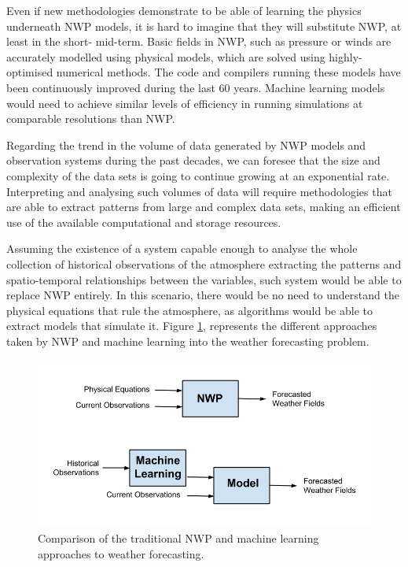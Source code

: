 \medskip

Even if new methodologies demonstrate to be able of learning the physics underneath NWP models, it is hard to imagine that they will substitute NWP, at least in the short- mid-term. Basic fields in NWP, such as pressure or winds are accurately modelled using physical models, which are solved using highly-optimised numerical methods. The code and compilers running these models have been continuously improved during the last 60 years. Machine learning models would need to achieve similar levels of efficiency in running simulations at comparable resolutions than NWP.

\medskip

Regarding the trend in the volume of data generated by NWP models and observation systems during the past decades, we can foresee that the size and complexity of the data sets is going to continue growing at an exponential rate. Interpreting and analysing such volumes of data will require methodologies that are able to extract patterns from large and complex data sets, making an efficient use of the available computational and storage resources. 

\medskip

Assuming the existence of a system capable enough to analyse the whole collection of historical observations of the atmosphere extracting the patterns and spatio-temporal relationships between the variables, such  system would be able to replace NWP entirely. In this scenario, there would be no need to understand the physical equations that rule the atmosphere, as algorithms would be able to extract models that simulate it. Figure \ref{nwp_vs_ml}, represents the different approaches taken by NWP and machine learning into the weather forecasting problem.

\medskip

\begin{figure}[h]
 \centerline{\includegraphics[width=12cm]{nwp_vs_ml.png}} \caption{Comparison of the traditional NWP and machine learning approaches to weather forecasting.}\label{nwp_vs_ml}
\end{figure}

